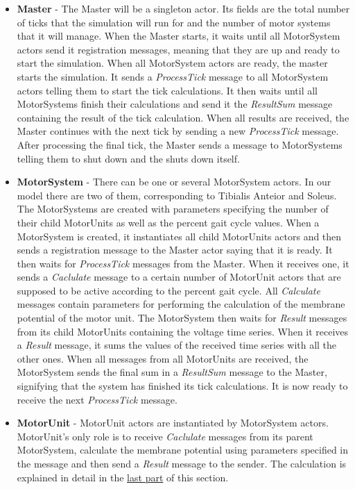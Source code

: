 \documentclass[titlepage]{article}
\begin{document}
\begin{itemize}
\item \textbf{Master} - The Master will be a singleton actor. Its fields are the total number of ticks that the simulation will run for and the number of motor systems that it will manage. When the Master starts, it waits until all MotorSystem actors send it registration messages, meaning that they are up and ready to start the simulation. When all MotorSystem actors are ready, the master starts the simulation. It sends a \textit{ProcessTick} message to all MotorSystem actors telling them to start the tick calculations. It then waits until all MotorSystems finish their calculations and send it the \textit{ResultSum} message containing the result of the tick calculation. When all results are received, the Master continues with the next tick by sending a new \textit{ProcessTick} message. After processing the final tick, the Master sends a message to MotorSystems telling them to shut down and the shuts down itself.
\item \textbf{MotorSystem} - There can be one or several MotorSystem actors. In our model there are two of them, corresponding to Tibialis Anteior and Soleus. The MotorSystems are created with parameters specifying the number of their child MotorUnits as well as the percent gait cycle values. When a MotorSystem is created, it instantiates all child MotorUnits actors and then sends a registration message to the Master actor saying that it is ready. It then waits for \textit{ProcessTick} messages from the Master. When it receives one, it sends a \textit{Caclulate} message to a certain number of MotorUnit actors that are supposed to be active according to the percent gait cycle. All \textit{Calculate} messages contain parameters for performing the calculation of the membrane potential of the motor unit. The MotorSystem then waits for \textit{Result} messages from its child MotorUnits containing the voltage time series. When it receives a \textit{Result} message, it sums the values of the received time series with all the other ones. When all messages from all MotorUnits are received, the MotorSystem sends the final sum in a \textit{ResultSum} message to the Master, signifying that the system has finished its tick calculations. It is now ready to receive the next \textit{ProcessTick} message.
\item \textbf{MotorUnit} - MotorUnit actors are instantiated by MotorSystem actors. MotorUnit's only role is to receive \textit{Caclulate} messages from its parent MotorSystem, calculate the membrane potential using parameters specified in the message and then send a \textit{Result} message to the sender. The calculation is explained in detail in the \hyperref[sec:calc]{last part} of this section.
\end{itemize}
\end{document}
